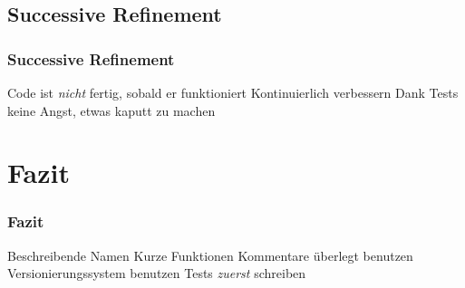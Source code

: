 \documentclass[handout]{beamer}
\begin{document}
\subsection{Successive Refinement}
\begin{frame}
    \frametitle{Successive Refinement}
    \begin{outline}
        \1 Code ist \emph{nicht} fertig, sobald er funktioniert
        \1 Kontinuierlich verbessern
        \1 Dank Tests keine Angst, etwas kaputt zu machen
    \end{outline}
\end{frame}

\section{Fazit}
\begin{frame}
    \frametitle{Fazit}
    \begin{outline}
        \1 Beschreibende Namen
        \1 Kurze Funktionen
        \1 Kommentare überlegt benutzen
        \1 Versionierungssystem benutzen
        \1 Tests \emph{zuerst} schreiben
    \end{outline}
\end{frame}
\end{document}
